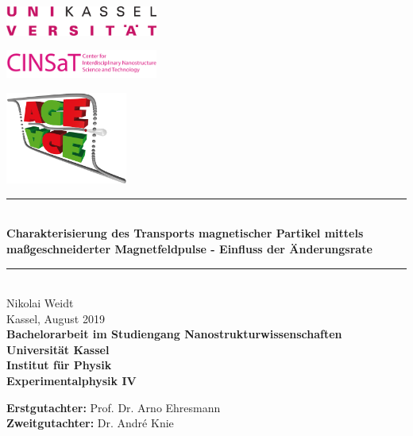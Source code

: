 \begin{titlepage}
  \begin{center}
    \begin{minipage}[T]{0.3\textwidth}
      \begin{flushleft}
        \includegraphics[width=5cm]{img/Uni}
      \end{flushleft}
    \end{minipage}
    \begin{minipage}[T]{0.3\textwidth}
      \centering
      \includegraphics[width=5cm]{img/CINSaT}
    \end{minipage}
    \begin{minipage}[T]{0.3\textwidth}
      \begin{flushright}
        \includegraphics[width=4cm]{img/AGE}
      \end{flushright}
    \end{minipage}
  \end{center}


  \begin{center}
    \vspace{2.5cm}

    \rule{\columnwidth}{1 pt}\\
    \vspace{0.5cm}
    {\LARGE
      \textbf{Charakterisierung des Transports magnetischer Partikel mittels maßgeschneiderter Magnetfeldpulse - Einfluss der Änderungsrate} \\ 
    }
    \rule{\columnwidth}{1 pt}\\
    \vspace{2cm}
    {\Large
      Nikolai Weidt\\
      Kassel, August 2019\\
      \vspace{1.5cm}
    }
    {\bfseries
    Bachelorarbeit im Studiengang Nanostrukturwissenschaften\\ 
    Universität Kassel\\
    Institut für Physik\\
    Experimentalphysik IV\\
    }
    \end{center}
      \vfill
      {\begin{tabbing}
      \textbf{Erstgutachter:} Prof. Dr. Arno Ehresmann \\
      \textbf{Zweitgutachter:} Dr. André Knie\\
      \end{tabbing}
      }

\end{titlepage}
\restoregeometry
